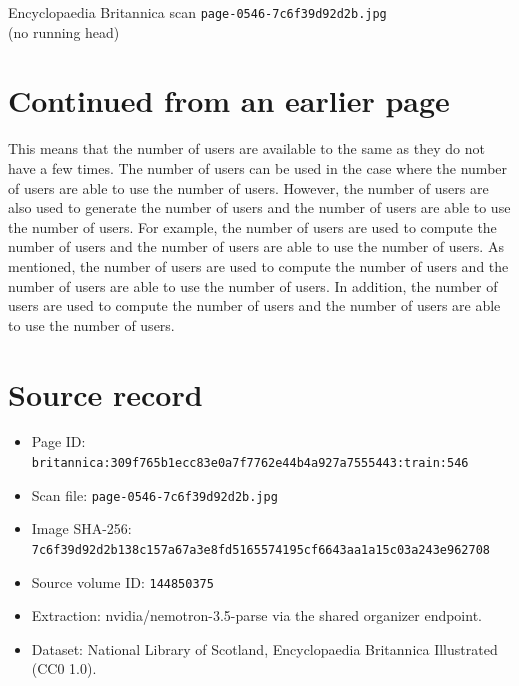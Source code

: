 \documentclass{article}
\begin{document}
\begin{center}
{\Large Encyclopaedia Britannica scan \texttt{page-0546-7c6f39d92d2b.jpg}}\\[0.5em]
(no running head)
\end{center}
\section*{Continued from an earlier page}
This means that the number of users are available to the same as they do not have a few times. The number of users can be used in the case where the number of users are able to use the number of users. However, the number of users are also used to generate the number of users and the number of users are able to use the number of users. For example, the number of users are used to compute the number of users and the number of users are able to use the number of users. As mentioned, the number of users are used to compute the number of users and the number of users are able to use the number of users. In addition, the number of users are used to compute the number of users and the number of users are able to use the number of users.

\section*{Source record}
\begin{itemize}
\item Page ID: \texttt{britannica:309f765b1ecc83e0a7f7762e44b4a927a7555443:train:546}
\item Scan file: \texttt{page-0546-7c6f39d92d2b.jpg}
\item Image SHA-256: \texttt{7c6f39d92d2b138c157a67a3e8fd5165574195cf6643aa1a15c03a243e962708}
\item Source volume ID: \texttt{144850375}
\item Extraction: nvidia/nemotron-3.5-parse via the shared organizer endpoint.
\item Dataset: National Library of Scotland, Encyclopaedia Britannica Illustrated (CC0 1.0).
\end{itemize}
\end{document}
